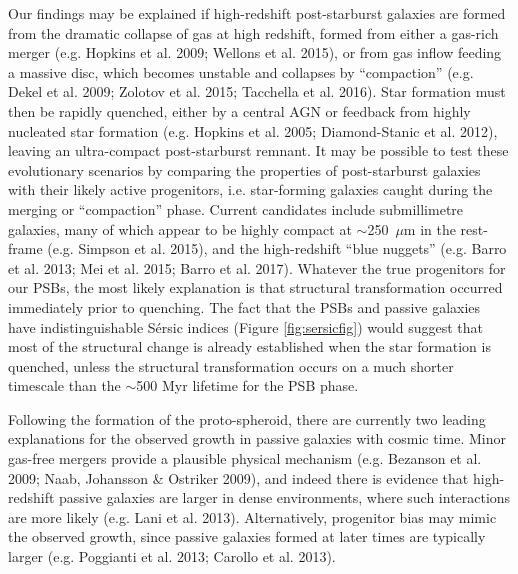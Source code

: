 \documentclass[a4paper,fleqn,usenatbib,useAMS]{mnras}
\begin{document}
Our findings may be explained if high-redshift post-starburst galaxies
are formed from the dramatic collapse of gas at high redshift, formed
from either a gas-rich merger (e.g.  Hopkins et al.  2009; Wellons et
al. 2015), or from gas inflow feeding a massive disc, which becomes
unstable and collapses by ``compaction'' (e.g. Dekel et al. 2009;
Zolotov et al. 2015; Tacchella et al. 2016). Star formation must then
be rapidly quenched, either by a central AGN or feedback from highly
nucleated star formation (e.g.  Hopkins et al. 2005; Diamond-Stanic et
al. 2012), leaving an ultra-compact post-starburst remnant. It may be
possible to test these evolutionary scenarios by comparing the
properties of post-starburst galaxies with their likely active
progenitors, i.e.  star-forming galaxies caught during the merging or
``compaction'' phase.  Current candidates include submillimetre
galaxies, many of which appear to be highly compact at
$\sim$250~$\mu$m in the rest-frame (e.g. Simpson et al. 2015), and the
high-redshift ``blue nuggets'' (e.g.  Barro et al.  2013; Mei et al.
2015; Barro et al. 2017).  Whatever the true progenitors for our PSBs,
the most likely explanation is that structural transformation occurred
immediately prior to quenching.  The fact that the PSBs and passive
galaxies have indistinguishable S\'{e}rsic indices (Figure
\ref{fig:sersicfig}) would suggest that most of the structural change
is already established when the star formation is quenched, unless the
structural transformation occurs on a much shorter timescale than the
$\sim$500 Myr lifetime for the PSB phase.


Following the formation of the proto-spheroid, there are currently two
leading explanations for the observed growth in passive galaxies with
cosmic time.  Minor gas-free mergers provide a plausible physical
mechanism (e.g. Bezanson et al. 2009; Naab, Johansson \& Ostriker
2009), and indeed there is evidence that high-redshift passive
galaxies are larger in dense environments, where such interactions are
more likely (e.g. Lani et al. 2013).  Alternatively, progenitor bias
may mimic the observed growth, since passive galaxies formed at later
times are typically larger (e.g. Poggianti et al. 2013; Carollo et
al. 2013).
\end{document}
